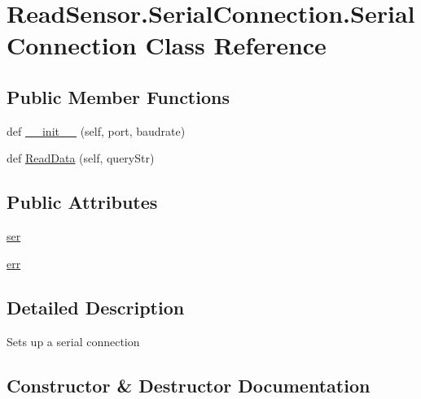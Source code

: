 \hypertarget{classReadSensor_1_1SerialConnection_1_1SerialConnection}{}\section{Read\+Sensor.\+Serial\+Connection.\+Serial\+Connection Class Reference}
\label{classReadSensor_1_1SerialConnection_1_1SerialConnection}
\subsection*{Public Member Functions}
\begin{DoxyCompactItemize}
\item 
def \hyperlink{classReadSensor_1_1SerialConnection_1_1SerialConnection_ac1fbc3f627689d90fe96d3e5d15ba117}{\+\_\+\+\_\+init\+\_\+\+\_\+} (self, port, baudrate)
\item 
def \hyperlink{classReadSensor_1_1SerialConnection_1_1SerialConnection_ae89d6b192e2aad071ff18f44818a7ac9}{Read\+Data} (self, query\+Str)
\end{DoxyCompactItemize}
\subsection*{Public Attributes}
\begin{DoxyCompactItemize}
\item 
\hyperlink{classReadSensor_1_1SerialConnection_1_1SerialConnection_a1e2d24c2fd693a56797a611a33cecd67}{ser}
\item 
\hyperlink{classReadSensor_1_1SerialConnection_1_1SerialConnection_a7942e305c2383cdbae17b3303f7dfe7a}{err}
\end{DoxyCompactItemize}


\subsection{Detailed Description}
\begin{DoxyVerb}Sets up a serial connection\end{DoxyVerb}
 

\subsection{Constructor \& Destructor Documentation}
